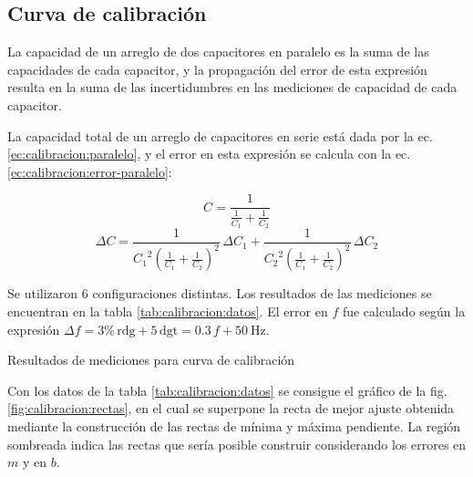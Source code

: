 \subsection{Curva de calibración}
\label{sec:calibracion}

La capacidad de un arreglo de dos capacitores en paralelo es la suma de las
capacidades de cada capacitor, y la propagación del error de esta expresión 
resulta en la suma de las incertidumbres en las mediciones de capacidad de cada
capacitor.

La capacidad total de un arreglo de capacitores en serie está dada por la ec.
\ref{ec:calibracion:paralelo}, y el error en esta expresión se calcula con la
ec. \ref{ec:calibracion:error-paralelo}:

\vspace{10mm}
\begin{equation}
    \label{ec:calibracion:paralelo}
    C = \frac{1}{\frac{1}{C_1} + \frac{1}{C_2}}
\end{equation}
\vspace{10mm}
\begin{equation}
    \label{ec:calibracion:error-paralelo}
    \Delta C =
    \frac{1}{{C_1}^2 \left( \frac{1}{C_1} + \frac{1}{C_2} \right)^2} \, \Delta C_1 + 
    \frac{1}{{C_2}^2 \left( \frac{1}{C_1} + \frac{1}{C_2} \right)^2} \, \Delta C_2
\end{equation}
\vspace{10mm}

Se utilizaron 6 configuraciones distintas. Los resultados de las mediciones se
encuentran en la tabla \ref{tab:calibracion:datos}.
El error en $f$ fue calculado según la expresión
$\Delta f = 3\%\,\text{rdg} + 5\,\text{dgt}
          = 0.3\, f + \SI{50}{\hertz}$.

\vspace{10mm}
\begin{table}[H]
    \centering
    \caption{Resultados de mediciones para curva de calibración}
    \label{tab:calibracion:datos}
\end{table}
\vspace{10mm}

Con los datos de la tabla \ref{tab:calibracion:datos} se consigue el gráfico
de la fig. \ref{fig:calibracion:rectas}, en el cual se superpone la recta
de mejor ajuste obtenida mediante la construcción de las rectas de mínima y 
máxima pendiente. La región sombreada indica las rectas que sería posible 
construir considerando los errores en $m$ y en $b$.

